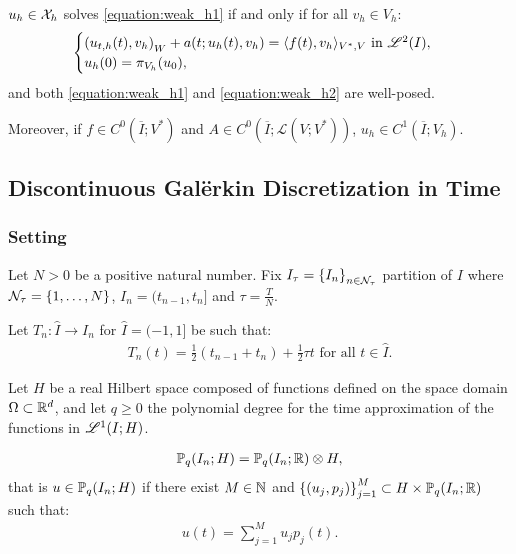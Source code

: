 \begin{proposition}[Equivalence]
    $u_h \in \mathcal{X}_h$ solves \eqref{equation:weak_h1} if and only if for all $v_h \in V_h$:
    \begin{gather}
        \begin{cases} \label{equation:weak_h2}
            \left( u_{t, h}(t), v_h \right)_W + a(t; u_h(t), v_h) = \langle f(t), v_h \rangle_{V^*, V} \text{ in } \mathscr{L}^{2}(I), \\
            u_h(0) = \pi_{V_h}(u_0),
        \end{cases}
    \end{gather}
    and both \eqref{equation:weak_h1} and \eqref{equation:weak_h2} are well-posed.

    Moreover, if $f \in C^0(\overline{I}; V^*)$ and $A \in C^0(\overline{I}; \mathcal{L}(V; V^*))$, $u_h \in C^1(\overline{I}; V_h)$.
\end{proposition}

\newpage
\subsection{Discontinuous Galërkin Discretization in Time}

\subsubsection{Setting}

Let $N > 0$ be a positive natural number. Fix $I_{\tau} = \left\{ I_n \right\}_{n \in \mathcal{N}_{\tau}}$ partition of $I$ where $\mathcal{N}_{\tau} = \left\{ 1, \dots, N \right\}$, $I_n = (t_{n - 1}, t_n]$ and $\tau = \frac{T}{N}$.

\begin{definition}[Mapping]
    Let $T_n \colon \hat{I} \rightarrow I_n$ for $\hat{I} = (-1, 1]$ be such that:
    \begin{gather}
        T_n(t) = \frac{1}{2}(t_{n - 1} + t_n) + \frac{1}{2} \tau t \text{ for all } t \in \hat{I}.
    \end{gather}
\end{definition}

Let $H$ be a real Hilbert space composed of functions defined on the space domain $\Omega \subset \mathbb{R}^{d}$, and let $q \geq 0$ the polynomial degree for the time approximation of the functions in $\mathscr{L}^{1}(I; H)$.

\begin{definition}[$\Pk{q}(I_n; H)$]
    \begin{gather}
        \mathbb{P}_{q}(I_n; H) = \mathbb{P}_{q}(I_n; \mathbb{R}) \otimes H,
    \end{gather}
    that is $u \in \mathbb{P}_{q}(I_n; H)$ if there exist $M \in \mathbb{N}$ and $\left\{ (u_j, p_j) \right\}_{j = 1}^M \subset H \times \mathbb{P}_{q}(I_n; \mathbb{R})$ such that:
    \begin{gather}
        u(t) = \sum_{j = 1}^M u_j p_j(t).
    \end{gather}
\end{definition}

